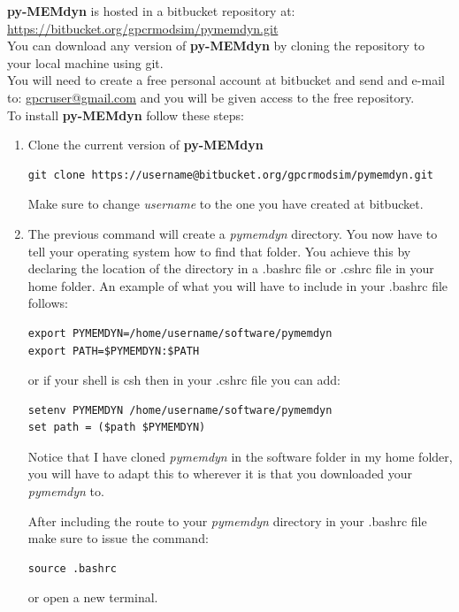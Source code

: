 \documentclass[10pt, oneside, pdftex]{article}
\begin{document}
\noindent \textbf{py-MEMdyn} is hosted in a bitbucket repository at:\\

\noindent \url{https://bitbucket.org/gpcrmodsim/pymemdyn.git}\\

\noindent  You  can  download  any version  of  \textbf{py-MEMdyn}  by
cloning the repository to your local machine using git.\\

\noindent You will need to create a free personal account at bitbucket
and send and e-mail to: \url{gpcruser@gmail.com} and you will be given
access to the free repository.\\

\noindent To install \textbf{py-MEMdyn} follow these steps:
\begin{enumerate}
\item{Clone the current version of \textbf{py-MEMdyn}
\begin{Verbatim}
git clone https://username@bitbucket.org/gpcrmodsim/pymemdyn.git
\end{Verbatim}
Make sure to change \textit{username} to the one you have created 
at bitbucket.}

\item{The previous command will  create a \textit{pymemdyn} directory.
  You  now  have to  tell  your  operating  system  how to  find  that
  folder. You achieve this by  declaring the location of the directory
  in a .bashrc file or .cshrc file in your home folder.  An example of
  what you will have to include in your .bashrc file follows:
\begin{Verbatim}
export PYMEMDYN=/home/username/software/pymemdyn
export PATH=$PYMEMDYN:$PATH
\end{Verbatim}
or if your shell is csh then in your .cshrc file you can add:
\begin{Verbatim}
setenv PYMEMDYN /home/username/software/pymemdyn
set path = ($path $PYMEMDYN)
\end{Verbatim}

Notice that I have cloned  \textit{pymemdyn} in the software folder in
my home folder, you will have to adapt this to wherever it is that you
downloaded your \textit{pymemdyn} to.

After including the route to your \textit{pymemdyn} directory in your
.bashrc file make sure to issue the command:
\begin{Verbatim}
source .bashrc
\end{Verbatim}
or open a new terminal.\\

}
\end{enumerate}
\end{document}
